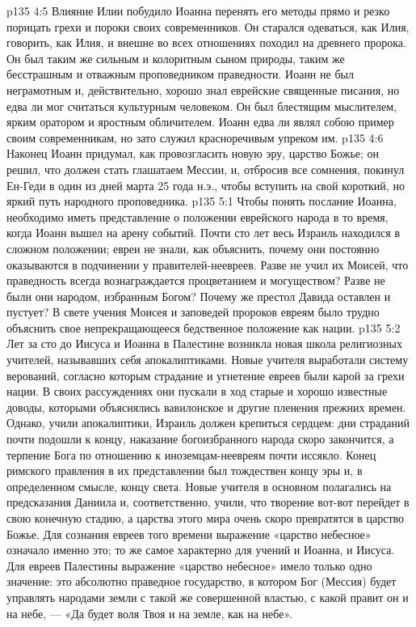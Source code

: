 \vs p135 4:5 Влияние Илии побудило Иоанна перенять его методы прямо и резко порицать грехи и пороки своих современников. Он старался одеваться, как Илия, говорить, как Илия, и внешне во всех отношениях походил на древнего пророка. Он был таким же сильным и колоритным сыном природы, таким же бесстрашным и отважным проповедником праведности. Иоанн не был неграмотным и, действительно, хорошо знал еврейские священные писания, но едва ли мог считаться культурным человеком. Он был блестящим мыслителем, ярким оратором и яростным обличителем. Иоанн едва ли являл собою пример своим современникам, но зато служил красноречивым упреком им.
\vs p135 4:6 Наконец Иоанн придумал, как провозгласить новую эру, царство Божье; он решил, что должен стать глашатаем Мессии, и, отбросив все сомнения, покинул Ен\hyp{}Геди в один из дней марта 25 года н.э., чтобы вступить на свой короткий, но яркий путь народного проповедника.
\vs p135 5:1 Чтобы понять послание Иоанна, необходимо иметь представление о положении еврейского народа в то время, когда Иоанн вышел на арену событий. Почти сто лет весь Израиль находился в сложном положении; евреи не знали, как объяснить, почему они постоянно оказываются в подчинении у правителей\hyp{}неевреев. Разве не учил их Моисей, что праведность всегда вознаграждается процветанием и могуществом? Разве не были они народом, избранным Богом? Почему же престол Давида оставлен и пустует? В свете учения Моисея и заповедей пророков евреям было трудно объяснить свое непрекращающееся бедственное положение как нации.
\vs p135 5:2 Лет за сто до Иисуса и Иоанна в Палестине возникла новая школа религиозных учителей, называвших себя апокалиптиками. Новые учителя выработали систему верований, согласно которым страдание и угнетение евреев были карой за грехи нации. В своих рассуждениях они пускали в ход старые и хорошо известные доводы, которыми объяснялись вавилонское и другие пленения прежних времен. Однако, учили апокалиптики, Израиль должен крепиться сердцем: дни страданий почти подошли к концу, наказание богоизбранного народа скоро закончится, а терпение Бога по отношению к иноземцам\hyp{}неевреям почти иссякло. Конец римского правления в их представлении был тождествен концу эры и, в определенном смысле, концу света. Новые учителя в основном полагались на предсказания Даниила и, соответственно, учили, что творение вот\hyp{}вот перейдет в свою конечную стадию, а царства этого мира очень скоро превратятся в царство Божье. Для сознания евреев того времени выражение «царство небесное» означало именно это; то же самое характерно для учений и Иоанна, и Иисуса. Для евреев Палестины выражение «царство небесное» имело только одно значение: это абсолютно праведное государство, в котором Бог (Мессия) будет управлять народами земли с такой же совершенной властью, с какой правит он и на небе, --- «Да будет воля Твоя и на земле, как на небе».
